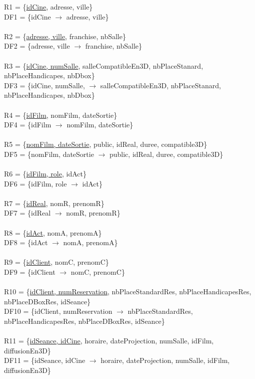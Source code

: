 \documentclass[a4paper,sffamily,12pt]{article}
\begin{document}
				\noindent R1 = \{\underline{idCine}, adresse, ville\} \\  DF1 = \{idCine $\rightarrow$ adresse, ville\} \\
				\\
				R2 = \{\underline{adresse, ville}, franchise, nbSalle\} \\ DF2 = \{adresse, ville $\rightarrow$ franchise, nbSalle\} \\
				\\
				R3 = \{\underline{idCine, numSalle}, salleCompatibleEn3D, nbPlaceStanard, nbPlaceHandicapes, nbDbox\} \\ DF3 = \{idCine, numSalle, $\rightarrow$ salleCompatibleEn3D, nbPlaceStanard, nbPlaceHandicapes, nbDbox\} \\
				\\
				R4 = \{\underline{idFilm}, nomFilm, dateSortie\} \\ DF4 = \{idFilm $\rightarrow$ nomFilm, dateSortie\} \\
				\\
				R5 = \{\underline{nomFilm, dateSortie}, public, idReal, duree, compatible3D\} \\ DF5 = \{nomFilm, dateSortie $\rightarrow$ public, idReal, duree, compatible3D\} \\	
				\\							
				R6 = \{\underline{idFilm, role}, idAct\} \\ DF6 = \{idFilm, role $\rightarrow$  idAct\} \\
				\\
				R7 = \{\underline{idReal}, nomR, prenomR\} \\ DF7 = \{idReal $\rightarrow$ nomR, prenomR\} \\
				\\
				R8 = \{\underline{idAct}, nomA, prenomA\} \\ DF8 = \{idAct $\rightarrow$ nomA, prenomA\} \\
				\\
				R9 = \{\underline{idClient}, nomC, prenomC\} \\ DF9 = \{idClient $\rightarrow$ nomC, prenomC\} \\ 
				\\
				R10 = \{\underline{idClient, numReservation}, nbPlaceStandardRes, nbPlaceHandicapesRes, nbPlaceDBoxRes, idSeance\} \\ DF10 = \{idClient, numReservation $\rightarrow$  nbPlaceStandardRes, nbPlaceHandicapesRes, nbPlaceDBoxRes, idSeance\} \\
				\\
				R11 = \{\underline{idSeance, idCine}, horaire, dateProjection, numSalle, idFilm, diffusionEn3D\} \\ DF11 = \{idSeance, idCine $\rightarrow$ horaire, dateProjection, numSalle, idFilm, diffusionEn3D\} \\
				
\end{document}
